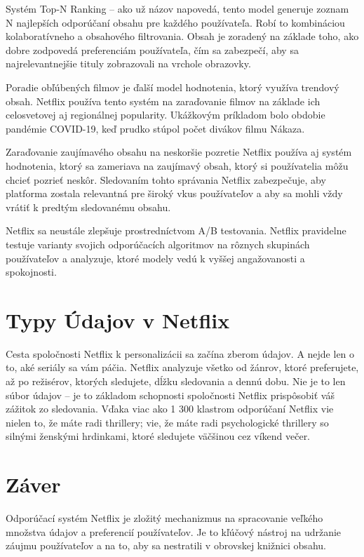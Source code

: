 \documentclass[10pt,slovak,a4paper]{article}
\begin{document}
Systém Top-N Ranking – ako už názov napovedá, tento model generuje zoznam N najlepších odporúčaní obsahu pre každého používateľa. Robí to kombináciou kolaboratívneho a obsahového filtrovania. Obsah je zoradený na základe toho, ako dobre zodpovedá preferenciám používateľa, čím sa zabezpečí, aby sa najrelevantnejšie tituly zobrazovali na vrchole obrazovky.\cite{Top}


Poradie obľúbených filmov je ďalší model hodnotenia, ktorý využíva trendový obsah. Netflix používa tento systém na zaraďovanie filmov na základe ich celosvetovej aj regionálnej popularity. Ukážkovým príkladom bolo obdobie pandémie COVID-19, keď prudko stúpol počet divákov filmu Nákaza.\cite{Top} 


Zaraďovanie zaujímavého obsahu na neskoršie pozretie
Netflix používa aj systém hodnotenia, ktorý sa zameriava na zaujímavý obsah, ktorý si používatelia môžu chcieť pozrieť neskôr. Sledovaním tohto správania Netflix zabezpečuje, aby platforma zostala relevantná pre široký vkus používateľov a aby sa mohli vždy vrátiť k predtým sledovanému obsahu.\cite{Top}\cite{Ranking:System}


Netflix sa neustále zlepšuje prostredníctvom A/B testovania. Netflix pravidelne testuje varianty svojich odporúčacích algoritmov na rôznych skupinách používateľov a analyzuje, ktoré modely vedú k vyššej angažovanosti a spokojnosti.\cite{Ranking:System}

\section{Typy Údajov v Netflix}
Cesta spoločnosti Netflix k personalizácii sa začína zberom údajov. A nejde len o to, aké seriály sa vám páčia. Netflix analyzuje všetko od žánrov, ktoré preferujete, až po režisérov, ktorých sledujete, dĺžku sledovania a dennú dobu. Nie je to len súbor údajov – je to základom schopnosti spoločnosti Netflix prispôsobiť váš zážitok zo sledovania. Vďaka viac ako 1 300 klastrom odporúčaní Netflix vie nielen to, že máte radi thrillery; vie, že máte radi psychologické thrillery so silnými ženskými hrdinkami, ktoré sledujete väčšinou cez víkend večer.\cite{Bennett}\cite{Data}

\section{Záver}
Odporúčací systém Netflix je zložitý mechanizmus na spracovanie veľkého množstva údajov a preferencií používateľov. Je to kľúčový nástroj na udržanie záujmu používateľov a na to, aby sa nestratili v obrovskej knižnici obsahu.



\end{document}
